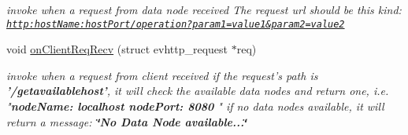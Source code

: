 \begin{DoxyCompactItemize}
\begin{DoxyCompactList}\small\item\em invoke when a request from data node received \-The request url should be this kind\-: \href{http:hostName:hostPort/operation?param1=value1&param2=value2}{\tt http\-:host\-Name\-:host\-Port/operation?param1=value1\&param2=value2} \end{DoxyCompactList}\item 
void \hyperlink{classSQSMaster_a0da388946c6cf48d2434d7ccdf4113fd}{on\-Client\-Req\-Recv} (struct evhttp\-\_\-request $\ast$req)
\begin{DoxyCompactList}\small\item\em invoke when a request from client received if the request's path is {\bfseries '/getavailablehost'}, it will check the available data nodes and return one, i.\-e. "{\bfseries  node\-Name\-: localhost node\-Port\-: 8080 }" if no data nodes available, it will return a message\-: {\bfseries \char`\"{}\-No Data Node available...\char`\"{}} \end{DoxyCompactList}\end{DoxyCompactItemize}
